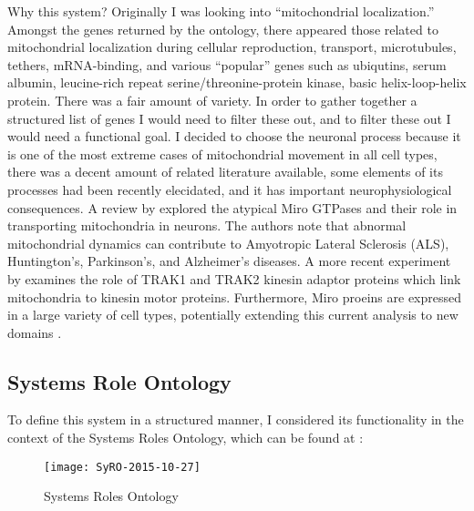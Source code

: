 Why this system? Originally I was looking into ``mitochondrial localization.''
Amongst the genes returned by the ontology, there appeared those related to
mitochondrial localization during cellular reproduction, transport,
microtubules, tethers, mRNA-binding, and various ``popular'' genes such as
ubiqutins, serum  albumin, leucine-rich repeat serine/threonine-protein kinase,
basic helix-loop-helix protein. There was a fair amount of variety. In order to
gather together a structured list of genes I would need to filter these out, and
to filter these out I would need a functional goal. I decided to choose the
neuronal process because it is one of the most extreme cases of mitochondrial
movement in all cell types, there was a decent amount of related literature
available, some elements of its processes had been recently elecidated, and it
has important neurophysiological consequences. A review by \cite{Reis2009}
explored the atypical Miro GTPases and their role in transporting mitochondria
in neurons. The authors note that abnormal mitochondrial dynamics can contribute
to Amyotropic Lateral Sclerosis (ALS), Huntington's, Parkinson's, and
Alzheimer's diseases. A more recent experiment by \cite{Loss2015} examines the
role of TRAK1 and TRAK2 kinesin adaptor proteins which link mitochondria to
kinesin motor proteins. Furthermore, Miro proeins are expressed in a large
variety of cell types, potentially extending this current analysis to new
domains \citep{Reis2009}.

\subsection{Systems Role Ontology}

To define this system in a structured manner, I considered its functionality
in the context of the Systems Roles Ontology, which can be found at \SyRO:

\begin{figure}[h!]
  \centering
    \texttt{[image: SyRO-2015-10-27]}
  \caption{Systems Roles Ontology}
\end{figure}

